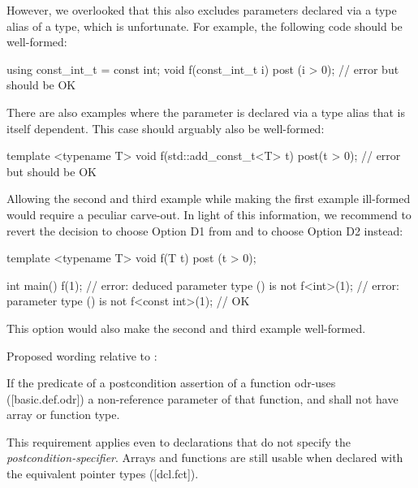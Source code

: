 However, we overlooked that this also excludes parameters declared via a type alias of a  type, which is unfortunate. For example, the following code should be well-formed:

\begin{codeblock}
using const_int_t = const int;
void f(const_int_t i) post (i > 0);  // error but should be OK
\end{codeblock}

There are also examples where the parameter is declared via a type alias that is itself dependent. This case should arguably also be well-formed:

\begin{codeblock}
template <typename T>
void f(std::add_const_t<T> t) post(t > 0);  // error but should be OK
\end{codeblock}

Allowing the second and third example while making the first example ill-formed would require a peculiar carve-out. In light of this information, we recommend to revert the decision to choose Option D1 from \cite{P3489R0} and to choose Option D2 instead:
\begin{codeblock}
template <typename T>
void f(T t) post (t > 0);  

int main() {
  f(1);              // error: deduced parameter type () is not 
  f<int>(1);         // error: parameter type () is not 
  f<const int>(1);   // OK
}
\end{codeblock}
This option would also make the second and third example well-formed.

Proposed wording relative to \cite{P2900R11}:

\begin{adjustwidth}{0.5cm}{0.5cm}
If the predicate of a postcondition assertion of a function odr-uses ([basic.def.odr]) a non-reference parameter of that function,  and shall not have array or function type.

\begin{note}
This requirement applies even to declarations that do not specify the \emph{postcondition-specifier}. Arrays and functions are still usable when declared with the equivalent pointer types ([dcl.fct]).
\end{note}
\end{adjustwidth}


